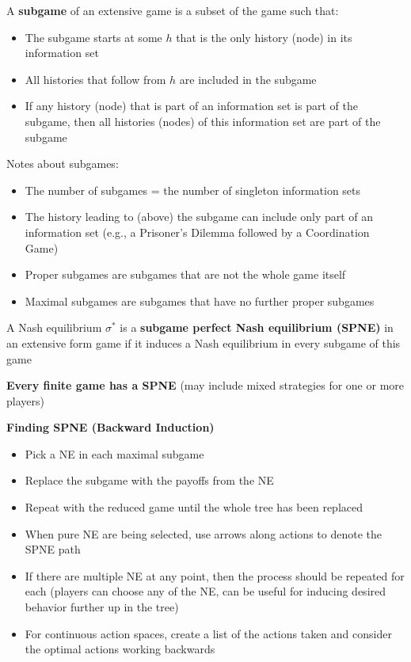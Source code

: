 \documentclass{report}
\newcommand{\FlowerSmall}{\mbox{\raisebox{-1pt}{\small\EightFlowerPetalRemoved}}} %
\begin{document}
A \textbf{subgame} of an extensive game is a subset of the game such that:
\begin{itemize}
	\item{The subgame starts at some $h$ that is the only history (node) in its information set}
	\item{All histories that follow from $h$ are included in the subgame}
	\item{If any history (node) that is part of an information set is part of the subgame, then all histories (nodes) of this information set are part of the subgame}
\end{itemize} \bigskip

Notes about subgames:
\begin{itemize}
	\item{The number of subgames = the number of singleton information sets}
	\item{The history leading to (above) the subgame can include only part of an information set (e.g., a Prisoner's Dilemma followed by a Coordination Game)}
	\item{Proper subgames are subgames that are not the whole game itself}
	\item{Maximal subgames are subgames that have no further proper subgames}
\end{itemize} \bigskip

A Nash equilibrium $\sigma^*$ is a \textbf{subgame perfect Nash equilibrium (SPNE)} in an extensive form game if it induces a Nash equilibrium in every subgame of this game \bigskip

\textbf{Every finite game has a SPNE} (may include mixed strategies for one or more players)

\bigskip
\begin{mdframed}
	\medskip
	\begin{center} \textbf{{\large Finding SPNE (Backward Induction)}} \end{center}
	\begin{itemize}[label=\FlowerSmall]
		\item{Pick a NE in each maximal subgame}
		\item{Replace the subgame with the payoffs from the NE}
		\item{Repeat with the reduced game until the whole tree has been replaced}
		\item{When pure NE are being selected, use arrows along actions to denote the SPNE path}
		\item{If there are multiple NE at any point, then the process should be repeated for each (players can choose any of the NE, can be useful for inducing desired behavior further up in the tree)}
		\item{For continuous action spaces, create a list of the actions taken and consider the optimal actions working backwards}
	\end{itemize}
	\smallskip
\end{mdframed}
\bigskip
\end{document}
